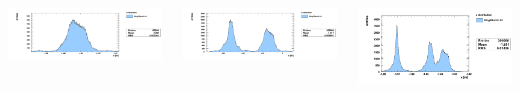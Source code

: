 \documentclass{beamer}
\begin{document}
{    \begin{block}{}
    \end{block}
    \begin{columns}
      \begin{column}{4.0cm}
	\includegraphics[width=\linewidth]{figures/Ring3Bunch-x-step-2388.png}         
      \end{column}
      \begin{column}{4.0cm}
	\includegraphics[width=\linewidth]{figures/Ring3Bunch-x-step-2447.png}         
      \end{column}
      \begin{column}{4.0cm}
	\includegraphics[width=\linewidth]{figures/Ring3Bunch-x-step-2509.png}         
      \end{column}
    \end{columns}
  }
\end{document}
